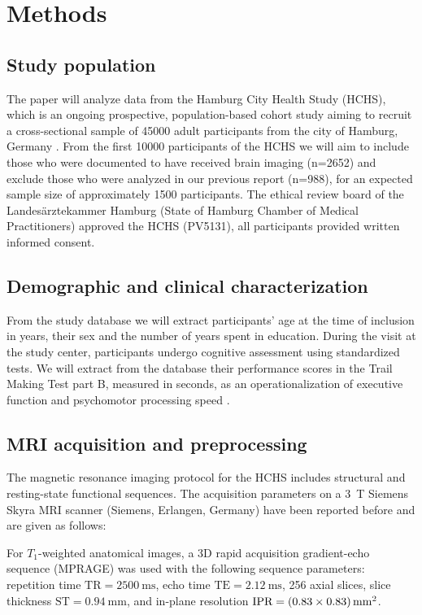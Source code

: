 \section{Methods} \label{methods}

\subsection{Study population}
The paper will analyze data from the Hamburg City Health Study (HCHS), which is an ongoing prospective, population-based cohort study aiming to recruit a cross-sectional sample of \num{45000} adult participants from the city of Hamburg, Germany \citep{Jagodzinski2020-lx}.
From the first \num{10000} participants of the HCHS we will aim to include those who were documented to have received brain imaging (n=2652) and exclude those who were analyzed in our previous report \citep{Schlemm2022-he} (n=988), for an expected sample size of approximately 1500 participants.
The ethical review board of the Landesärztekammer Hamburg (State of Hamburg Chamber of Medical Practitioners) approved the HCHS (PV5131), all participants provided written informed consent.

\subsection{Demographic and clinical characterization}
From the study database we will extract participants’ age at the time of inclusion in years, their sex and the number of years spent in education.
During the visit at the study center, participants undergo cognitive assessment using standardized tests.
We will extract from the database their performance scores in the Trail Making Test part B, measured in seconds, as an operationalization of executive function and psychomotor processing speed \citep{Tombaugh2004-dp,arbuthnott2000trail}.

\subsection{MRI acquisition and preprocessing}
The magnetic resonance imaging protocol for the HCHS includes structural and resting-state functional sequences.
The acquisition parameters on a \qty{3}{\tesla} Siemens Skyra MRI scanner (Siemens, Erlangen, Germany) have been reported before \citep{Petersen2020-cx,Frey2021-sv} and are given as follows:

For $T_1$-weighted anatomical images, a 3D rapid acquisition gradient-echo sequence (MPRAGE) was used with the following sequence parameters: repetition time $\text{TR} = \qty{2500}{\ms}$, echo time $\text{TE} = \qty{2.12}{\ms}$, 256 axial slices, slice thickness $\text{ST} = \qty{0.94}{\mm}$, and in-plane resolution  $\text{IPR} = \qtyproduct[product-units = bracket-power]{0.83 x 0.83}{\mm}$.


